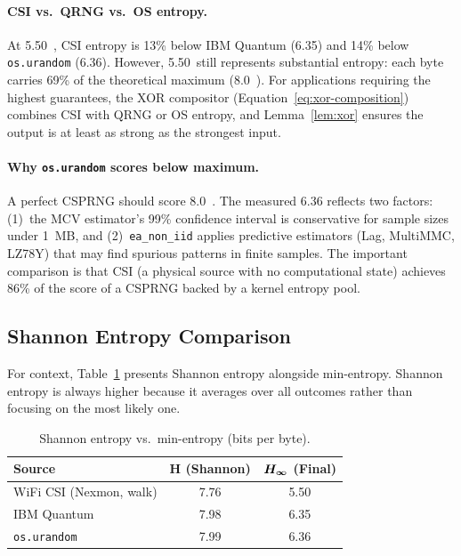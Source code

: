 \paragraph{CSI vs.\ QRNG vs.\ OS entropy.}
At 5.50~\bpb, CSI entropy is 13\% below IBM Quantum (6.35) and 14\% below \texttt{os.urandom} (6.36).
However, 5.50~\bpb still represents substantial entropy: each byte carries 69\% of the theoretical maximum (8.0~\bpb).
For applications requiring the highest guarantees, the XOR compositor (Equation~\ref{eq:xor-composition}) combines CSI with QRNG or OS entropy, and Lemma~\ref{lem:xor} ensures the output is at least as strong as the strongest input.

\paragraph{Why \texttt{os.urandom} scores below maximum.}
A perfect CSPRNG should score 8.0~\bpb.
The measured 6.36 reflects two factors: (1)~the MCV estimator's 99\% confidence interval is conservative for sample sizes under 1~MB, and (2)~\texttt{ea\_non\_iid} applies predictive estimators (Lag, MultiMMC, LZ78Y) that may find spurious patterns in finite samples.
The important comparison is that CSI (a physical source with no computational state) achieves 86\% of the score of a CSPRNG backed by a kernel entropy pool.

\subsection{Shannon Entropy Comparison}
\label{subsec:shannon-comparison}

For context, Table~\ref{tab:shannon} presents Shannon entropy alongside min-entropy.
Shannon entropy is always higher because it averages over all outcomes rather than focusing on the most likely one.

\begin{table}[t]
\centering
\caption{Shannon entropy vs.\ min-entropy (bits per byte).}
\label{tab:shannon}
\small
\begin{tabular}{@{}lcc@{}}
\toprule
\textbf{Source} & $\boldsymbol{H}$ \textbf{(Shannon)} & $\boldsymbol{H_{\infty}}$ \textbf{(Final)} \\
\midrule
WiFi CSI (Nexmon, walk) & 7.76 & 5.50 \\
IBM Quantum & 7.98 & 6.35 \\
\texttt{os.urandom} & 7.99 & 6.36 \\
\bottomrule
\end{tabular}
\end{table}

